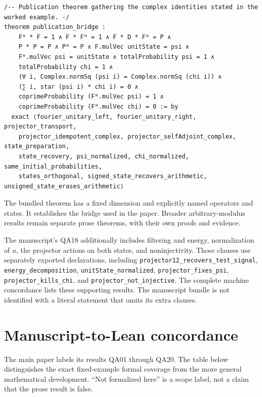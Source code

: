 \begin{Verbatim}[breaklines=true,breakanywhere=true,fontsize=\footnotesize,samepage=true]
/-- Publication theorem gathering the complex identities stated in the worked example. -/
theorem publication_bridge :
    Fᴴ * F = 1 ∧ F * Fᴴ = 1 ∧ F * D * Fᴴ = P ∧
    P * P = P ∧ Pᴴ = P ∧ F.mulVec unitState = psi ∧
    Fᴴ.mulVec psi = unitState ∧ totalProbability psi = 1 ∧
    totalProbability chi = 1 ∧
    (∀ i, Complex.normSq (psi i) = Complex.normSq (chi i)) ∧
    (∑ i, star (psi i) * chi i) = 0 ∧
    coprimeProbability (Fᴴ.mulVec psi) = 1 ∧
    coprimeProbability (Fᴴ.mulVec chi) = 0 := by
  exact ⟨fourier_unitary_left, fourier_unitary_right, projector_transport,
    projector_idempotent_complex, projector_selfAdjoint_complex, state_preparation,
    state_recovery, psi_normalized, chi_normalized, same_initial_probabilities,
    states_orthogonal, signed_state_recovers_arithmetic, unsigned_state_erases_arithmetic⟩
\end{Verbatim}

The bundled theorem has a fixed dimension and explicitly named operators and
states. It establishes the bridge used in the paper. Broader arbitrary-modulus
results remain separate prose theorems, with their own proofs and evidence.

The manuscript's QA18 additionally includes filtering and energy, normalization
of \(u\), the projector actions on both states, and noninjectivity. Those clauses
use separately exported declarations, including
\texttt{projector12\_recovers\_test\_signal}, \texttt{energy\_decomposition},
\texttt{unitState\_normalized}, \texttt{projector\_fixes\_psi},
\texttt{projector\_kills\_chi}, and \texttt{projector\_not\_injective}.
The complete machine concordance lists these supporting results. The manuscript
bundle is not identified with a literal statement that omits its extra clauses.

\section{Manuscript-to-Lean concordance}
The main paper labels its results QA01 through QA20. The table below distinguishes
the exact fixed-example formal coverage from the more general mathematical
development. ``Not formalized here'' is a scope label, not a claim that the prose
result is false.

